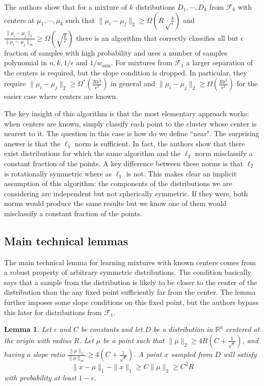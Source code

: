 \documentclass[11pt,letter]{article}
\newtheorem{lemma}{Lemma}
\begin{document}
The authors show that for a mixture of $k$ distributions $D_1, \cdots, D_k$ from $\mathcal F_0$ with centers at $\mu_1, \cdots, \mu_k$ such that $\| \mu_i - \mu_j \|_2 \geq \Omega\left(R \sqrt \frac k \epsilon \right)$ and $\frac{\|\mu_i - \mu_j\|_2}{\|\mu_i-\mu_j\|_{\infty}} \geq \Omega{\left( \sqrt{\frac{k}{\epsilon}}\right)}$ there is an algorithm that correctly classifies all but $\epsilon$ fraction of samples with high probability and uses a number of samples polynomial in $n, k, 1/\epsilon$ and $1/w_{\min}$. For mixtures from $\mathcal F_1$ a larger separation of the centers is required, but the slope condition is dropped. In particular, they require $\|\mu_i - \mu_j \|_2 \geq \Omega^* \left(\frac{Rk^{\frac{5}{2}}}{\epsilon^{2}}\right)$ in general and $\|\mu_i - \mu_j \|_2 \geq \Omega \left(\frac{Rk^{2}}{\epsilon^{2}}\right)$ for the easier case where centers are known.

The key insight of this algorithm is that the most elementary approach works: when centers are known, simply classify each point to the cluster whose center is nearest to it. The question in this case is how do we define ``near". The surprising answer is that the $\ell_1$ norm is sufficient. In fact, the authors show that there exist distributions for which the same algorithm and the $\ell_2$ norm misclassify a constant fraction of the points. A key difference between these norms is that $\ell_2$ is rotationally symmetric where as $\ell_1$ is not. This makes clear an implicit assumption of this algorithm: the components of the distributions we are considering are independent but not spherically symmetric. If they were, both norms would produce the same results but we know one of them would misclassify a constant fraction of the points. 

\subsection{Main technical lemmas}

The main technical lemma for learning mixtures with known centers comes from a robust property of arbitrary symmetric distributions. The condition basically says that a sample from the distribution is likely to be closer to the center of the distribution than the any fixed point sufficiently far from the center. The lemma further imposes some slope conditions on this fixed point, but the authors bypass this later for distributions from $\mathcal F_1$. 

\begin{lemma} \label{lem:heavy-tail-lem1}
Let $\epsilon$ and $C$ be constants and let $D$ be a distribution in $\mathbb R^n$ centered at the origin with radius $R$. Let $\mu$ be a point such that $\|\mu\|_2 \geq 4R(C+\frac{1}{\sqrt{\epsilon}})$, and having a slope ratio $\frac{\|\mu\|_2}{\|\mu\|_\infty} \geq 4(C+\frac{1}{\sqrt{\epsilon}})$. A point $x$ sampled from $D$ will satisfy 
\begin{equation*}
\|x-\mu\|_1 - \|x\|_1 \geq C\|\mu\|_2 \geq C^2R 
\end{equation*}
with probability at least $1-\epsilon$. 
 
\end{lemma} 
\end{document}
